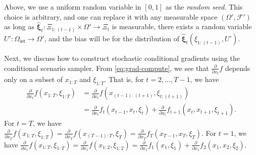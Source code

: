 \documentclass[11pt,fullpage,letterpaper]{article}
\newcommand{\mc}{\mathcal}
\newcommand{\p}{\mathbb{P}}
\newcommand{\bx}{\boldsymbol{\xi}}
\newcommand{\internal}{\mathsf{int}}
\begin{document}
Above, we use a uniform random variable in $[0,1]$ as the \textit{random seed}. This choice is arbitrary, and one can replace it with any measurable space $(\Omega',\mc F')$ as long as $\widehat{\bx}_t:\Xi_{1:(t-1)}\times \Omega'\to \Xi_t$ is measurable, there exists a random variable $U':\Omega_{\internal}\to \Omega'$, and the bias will be for the distribution of $\widehat{\bx}_t(\xi_{1:(t-1)},U')$. 




Next, we discuss how to construct stochastic conditional gradients using the conditional scenario sampler. From \eqref{eq:grad-compute}, we see that $\frac{\partial}{\partial x_t}f$ depends only on a subset of $x_{1:T}$ and $\xi_{1:T}$. That is, for $t=2,\ldots,T-1$, we have 
\begin{align*} 
    \frac{\partial }{\partial x_t}f(x_{1:T},\xi_{1:T}) &=\frac{\partial }{\partial x_t}f(x_{(t-1):(t+1)},\xi_{t:(t+1)})\\
    &=\frac{\partial }{\partial x_t}f_{t}(x_{t-1},x_t,\xi_t) + \frac{\partial }{\partial x_t}f_{t+1}(x_{t},x_{t+1},\xi_{t+1}). 
\end{align*}
For $t=T$, we have $\frac{\partial }{\partial x_T}f(x_{1:T},\xi_{1:T}) = \frac{\partial }{\partial x_T}f(x_{(T-1):T},\xi_{T})=\frac{\partial }{\partial x_T}f_{T}(x_{T-1},x_{T},\xi_{T})$. For $t=1$, we have $\frac{\partial }{\partial x_1}f(x_{1:T},\xi_{1:T}) =\frac{\partial }{\partial x_1}f(x_{1:2},\xi_{1:2})
    =\frac{\partial }{\partial x_1}f_{1}(x_1,\xi_1) + \frac{\partial }{\partial x_1}f_{2}(x_{1},x_{2},\xi_{2})$. 
\end{document}
